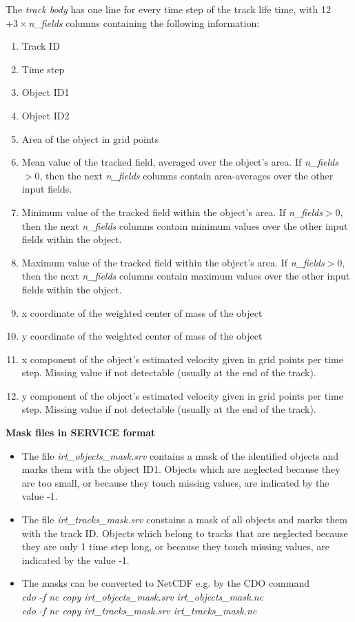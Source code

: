 \documentclass[11pt]{article}
\begin{document}
The {\it track body} has one line for every time step of the track life time, with 12$+3\times${\it n\_fields} columns containing the following information:
\begin{enumerate}
\item Track ID
\item Time step
\item Object ID1
\item Object ID2
\item Area of the object in grid points
\item Mean value of the tracked field, averaged over the object's area. If {\it n\_fields}$>0$, then the next {\it n\_fields} columns contain area-averages over the other input fields.
\item Minimum value of the tracked field within the object's area. If {\it n\_fields}$>0$, then the next {\it n\_fields} columns contain minimum values over the other input fields within the object.
\item Maximum value of the tracked field within the object's area. If {\it n\_fields}$>0$, then the next {\it n\_fields} columns contain maximum values over the other input fields within the object.
\item x coordinate of the weighted center of mass of the object
\item y coordinate of the weighted center of mass of the object
\item x component of the object's estimated velocity given in grid points per time step. Missing value if not detectable (usually at the end of the track).
\item y component of the object's estimated velocity given in grid points per time step. Missing value if not detectable (usually at the end of the track).
\end{enumerate}\vspace{0.5cm}
{\bf Mask files in SERVICE format}\\
\begin{itemize}
\item The file {\it irt\_objects\_mask.srv} contains a mask of the identified objects and marks them with the object ID1. Objects which are neglected because they are too small, or because they touch missing values, are indicated by the value -1.
\item The file {\it irt\_tracks\_mask.srv} constains a mask of all objects and marks them with the track ID. Objects which belong to tracks that are neglected because they are only 1 time step long, or because they touch missing values, are indicated by the value -1.
\item The masks can be converted to NetCDF e.g. by the CDO command\\
{\it cdo -f nc copy irt\_objects\_mask.srv irt\_objects\_mask.nc}\\
{\it cdo -f nc copy irt\_tracks\_mask.srv irt\_tracks\_mask.nc}
\end{itemize}
\end{document}
